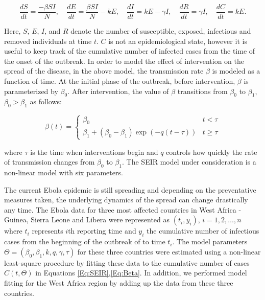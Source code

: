 \documentclass[10pt, journal,onecolumn]{IEEEtran}
\begin{document}
\begin{equation}
\dfrac{dS}{dt}	=	\dfrac{-\beta SI}{N},
\quad
\dfrac{dE}{dt}	=	\dfrac{\beta SI}{N}-kE,
\quad
\dfrac{dI}{dt}	=	kE-\gamma I,
\quad
\dfrac{dR}{dt}	=	\gamma I,
\quad
\dfrac{dC}{dt}	=	kE.
\label{Eq:SEIR}
\end{equation}

Here, $S$, $E$, $I$, and $R$ denote the number of susceptible, exposed, infectious and removed
individuals at time $t$. $C$ is not an epidemiological state, however it is useful to keep track of the cumulative
number of infected cases from the time of the onset of the outbreak. In order to model the effect of intervention on the spread of the disease, in the above model, the transmission rate $\beta$ is modeled as a function of time. At the initial phase of the outbreak, before intervention, $\beta$ is parameterized by $\beta_0$. After intervention, the value of $\beta$ transitions from $\beta_0$ to $\beta_1$, $\beta_0>\beta_1$ as follows:

\begin{equation}
\beta(t)=\begin{cases}
\beta_{0} & t<\tau\\
\beta_{1}+(\beta_{0}-\beta_{1})\exp\left(-q\left(t-\tau\right)\right) & t\ge\tau
\end{cases}
\label{Eq:Beta}
\end{equation}

\noindent where $\tau$ is the time when interventions begin and $q$ controls how quickly the rate
of transmission changes from $\beta_0$ to $\beta_1$. The SEIR model under consideration is a non-linear model with six parameters. 

The current Ebola epidemic is
still spreading and depending on the preventative measures  taken, the underlying dynamics of the
spread can change drastically any time. The Ebola data for three most affected countries in West Africa - Guinea, Sierra Leone and Libera were represented as $(t_i,y_i)$, $i=1,2,\ldots,n$ where $t_i$ represents $i$th reporting time and $y_i$ the cumulative number of infectious cases from the beginning of the outbreak of to time $t_i$.  The model parameters $\Theta=(\beta_0,\beta_1,k,q,\gamma, \tau)$ for these three countries were estimated using a non-linear least-square procedure by fitting these data to the cumulative number of cases $C(t,\Theta)$ in Equations \eqref{Eq:SEIR},\eqref{Eq:Beta}. In addition, we performed model fitting for the West Africa region
by adding up the data from these three countries. 
\end{document}
